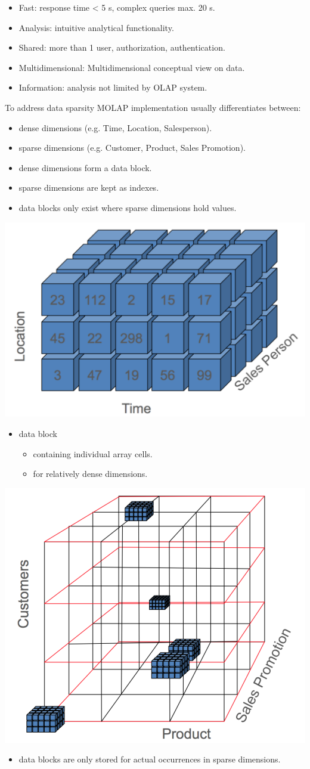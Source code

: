 \begin{breakbox}
\begin{itemize}
	\item \textcolor{Emerald}{F}ast: response time < 5 s, complex queries max. 20 s.
	\item \textcolor{Emerald}{A}nalysis: intuitive analytical functionality.
	\item \textcolor{Emerald}{S}hared: more than 1 user, authorization, authentication.
	\item \textcolor {Emerald}{M}ultidimensional: Multidimensional conceptual view on data.
	\item \textcolor{Emerald}{I}nformation: analysis not limited by OLAP system.
\end{itemize}
\end{breakbox}

\begin{breakbox}
\newline To address data sparsity MOLAP implementation usually differentiates between:
\begin{itemize}
	\item dense dimensions (e.g. Time, Location, Salesperson).
	\item sparse dimensions (e.g. Customer, Product, Sales Promotion).
	\item dense dimensions form a data block.
	\item sparse dimensions are kept as indexes.
	\item data blocks only exist where sparse dimensions hold values.
\end{itemize}
\begin{center}
\includegraphics[width=.05\textwidth]{slides_images/dense_molap.png}
\end{center}
\begin{itemize}
	\item data block
	\begin{itemize}
		\item containing individual array cells.
		\item for relatively dense dimensions.
	\end{itemize}
\end{itemize}
\begin{center}
\includegraphics[width=.05\textwidth]{slides_images/sparse_molap.png}
\end{center}
\begin{itemize}
	\item data blocks are only stored for actual occurrences in sparse dimensions.
\end{itemize}
\end{breakbox}
